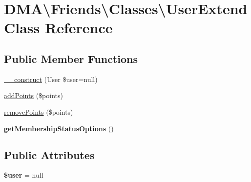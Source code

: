 \hypertarget{classDMA_1_1Friends_1_1Classes_1_1UserExtend}{\section{D\-M\-A\textbackslash{}Friends\textbackslash{}Classes\textbackslash{}User\-Extend Class Reference}
\label{classDMA_1_1Friends_1_1Classes_1_1UserExtend}
}
\subsection*{Public Member Functions}
\begin{DoxyCompactItemize}
\item 
\hyperlink{classDMA_1_1Friends_1_1Classes_1_1UserExtend_aa399d503ccb972cb46171bd7cc2fbadf}{\-\_\-\-\_\-construct} (User \$user=null)
\item 
\hyperlink{classDMA_1_1Friends_1_1Classes_1_1UserExtend_ae2d0cddf99425d8ffbe2ed2c74372024}{add\-Points} (\$points)
\item 
\hyperlink{classDMA_1_1Friends_1_1Classes_1_1UserExtend_a452030297bbe4f11bb8452e4d57396cd}{remove\-Points} (\$points)
\item 
\hypertarget{classDMA_1_1Friends_1_1Classes_1_1UserExtend_ac1de8e9326eaa1466503bf34fa0a3748}{{\bfseries get\-Membership\-Status\-Options} ()}\label{classDMA_1_1Friends_1_1Classes_1_1UserExtend_ac1de8e9326eaa1466503bf34fa0a3748}

\end{DoxyCompactItemize}
\subsection*{Public Attributes}
\begin{DoxyCompactItemize}
\item 
\hypertarget{classDMA_1_1Friends_1_1Classes_1_1UserExtend_ab5502f589b8c00f7a847a3ebece55281}{{\bfseries \$user} = null}\label{classDMA_1_1Friends_1_1Classes_1_1UserExtend_ab5502f589b8c00f7a847a3ebece55281}

\end{DoxyCompactItemize}



